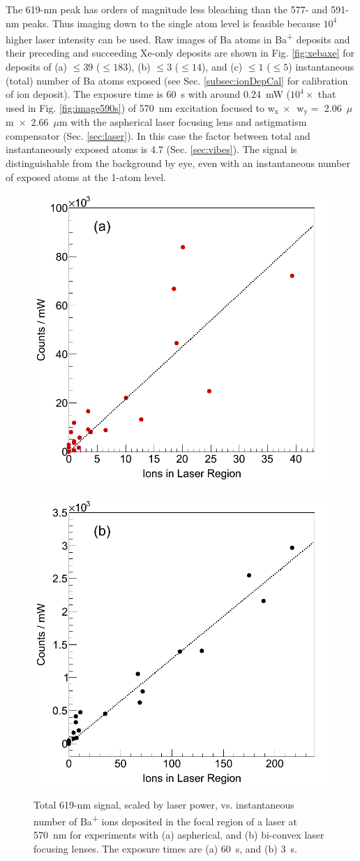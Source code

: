 The 619-nm peak has orders of magnitude less bleaching than the 577- and 591-nm peaks.  Thus imaging down to the single atom level is feasible because $10^4$ higher laser intensity can be used.  Raw images of Ba atoms in Ba\textsuperscript{+} deposits and their preceding and succeeding Xe-only deposits are shown in Fig. \ref{fig:xebaxe} for deposits of (a) $\leq 39$ ($\leq 183$), (b) $\leq 3$ ($\leq 14$), and (c) $\leq 1$ ($\leq 5$) instantaneous (total) number of Ba atoms exposed (see Sec. \ref{subsec:ionDepCal} for calibration of ion deposit).  The exposure time is 60~s with around 0.24~mW ($10^4 \times$ that used in Fig. \ref{fig:image590s}) of 570~nm excitation focused to w$_{\text{x}}~\times$~w$_{\text{y}} =$ 2.06~$\mu$m~$\times$~2.66~$\mu$m with the aspherical laser focusing lens and astigmatism compensator (Sec. \ref{sec:laser}).  In this case the factor between total and instantaneously exposed atoms is 4.7 (Sec. \ref{sec:vibes}).  The signal is distinguishable from the background by eye, even with an instantaneous number of exposed atoms at the 1-atom level.


\begin{figure} %
        \centering
                \includegraphics[width=.5\textwidth]{figures/lin_just20150807_lin.png}
                ~
                \includegraphics[width=.5\textwidth]{figures/lin_just20150526_lin_uncut.png}
                \caption{Total 619-nm signal, scaled by laser power, vs. instantaneous number of Ba\textsuperscript{+} ions deposited in the focal region of a laser at 570~nm for experiments with (a) aspherical, and (b) bi-convex laser focusing lenses.  The exposure times are (a) 60~s, and (b) 3~s.}
\label{fig:lin}
\end{figure}

